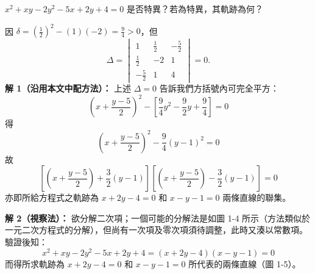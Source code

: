 \begin{example}
$x^2 + xy - 2y^2 - 5x + 2y + 4 = 0$ 是否特異？若為特異，其軌跡為何？
\end{example}

\begin{solution}
因 $\delta = \left(\frac{1}{2}\right)^2 - (1)(-2) = \frac{9}{4} > 0$，但
\[
\Delta = \begin{vmatrix} 1 & \frac{1}{2} & -\frac{5}{2} \\ \frac{1}{2} & -2 & 1 \\ -\frac{5}{2} & 1 & 4 \end{vmatrix} = 0.
\]
\textbf{解 1（沿用本文中配方法）：}
上述 $\Delta = 0$ 告訴我們方括號內可完全平方：
\[
\left(x + \frac{y-5}{2}\right)^2 - \left[\frac{9}{4}y^2 - \frac{9}{2}y + \frac{9}{4}\right] = 0
\]
得
\[
\left(x + \frac{y-5}{2}\right)^2 - \frac{9}{4}(y - 1)^2 = 0
\]
故
\[
\left[ \left(x + \frac{y-5}{2}\right) + \frac{3}{2}(y - 1) \right] \left[ \left(x + \frac{y-5}{2}\right) - \frac{3}{2}(y - 1) \right] = 0
\]
亦即所給方程式之軌跡為 $x + 2y - 4 = 0$ 和 $x - y - 1 = 0$ 兩條直線的聯集。

\textbf{解 2（視察法）：}
欲分解二次項；一個可能的分解法是如圖 1-4 所示（方法類似於一元二次方程式的分解），但尚有一次項及零次項須待調整，此時又湊以常數項。驗證後知：
\[
x^2 + xy - 2y^2 - 5x + 2y + 4 = (x + 2y - 4)(x - y - 1) = 0
\]
而得所求軌跡為 $x + 2y - 4 = 0$ 和 $x - y - 1 = 0$ 所代表的兩條直線（圖 1-5）。
\end{solution}

